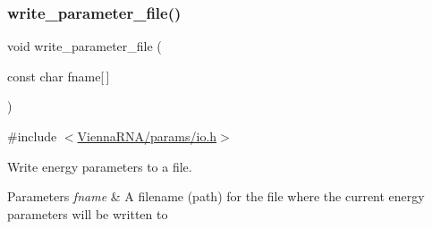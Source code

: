 \subsubsection{\texorpdfstring{write\+\_\+parameter\+\_\+file()}{write\_parameter\_file()}}
{\footnotesize\ttfamily void write\+\_\+parameter\+\_\+file (\begin{DoxyParamCaption}\item[{const char}]{fname\mbox{[}$\,$\mbox{]} }\end{DoxyParamCaption})}



{\ttfamily \#include $<$\hyperlink{io_8h}{Vienna\+R\+N\+A/params/io.\+h}$>$}



Write energy parameters to a file. 


\begin{DoxyParams}{Parameters}
{\em fname} & A filename (path) for the file where the current energy parameters will be written to \\
\hline
\end{DoxyParams}

